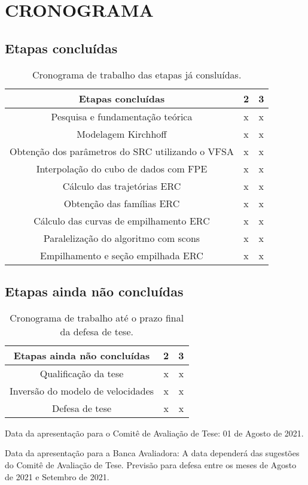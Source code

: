 \chapter{CRONOGRAMA}
\label{cap9:cronograma}


\section{Etapas concluídas}

    \begin{table}[H]
      \caption{Cronograma de trabalho das etapas já consluídas.}
      \centering
      
      \begin{tabular}{|c|c|c|}

      \hline
      \textbf{Etapas concluídas} & 2 & 3 \\ \hline
      Pesquisa e fundamentação teórica & x & x \\ \hline
      Modelagem Kirchhoff & x & x \\ \hline
      Obtenção dos parâmetros do SRC utilizando o VFSA & x & x \\ \hline
      Interpolação do cubo de dados com FPE & x & x \\ \hline
      Cálculo das trajetórias ERC & x & x \\ \hline
      Obtenção das famílias ERC & x & x \\ \hline
      Cálculo das curvas de empilhamento ERC & x & x \\ \hline
      Paralelização do algoritmo com scons & x & x \\ \hline
      Empilhamento e seção empilhada ERC & x & x  \\
      \hline
      
      \end{tabular}
  \end{table}
  
\section{Etapas ainda não concluídas}

   \begin{table}[H]
      \caption{Cronograma de trabalho até o prazo final da defesa de tese.}
      \centering
      
      \begin{tabular}{|c|c|c|}

      \hline
      \textbf{Etapas ainda não concluídas} & 2 & 3 \\ \hline
      Qualificação da tese & x & x \\ \hline
      Inversão do modelo de velocidades & x & x \\ \hline
      Defesa de tese & x & x  \\
      \hline
      
      \end{tabular}
  \end{table}

Data da apresentação para o Comitê de Avaliação de Tese: 01 de Agosto de 2021.
  
Data da apresentação para a Banca Avaliadora: A data dependerá das sugestões do
Comitê de Avaliação de Tese. Previsão para defesa entre os meses de Agosto de
2021 e Setembro de 2021.